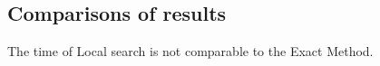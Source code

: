 
\subsection{Comparisons of results}

	The time of Local search is not comparable to the Exact Method.